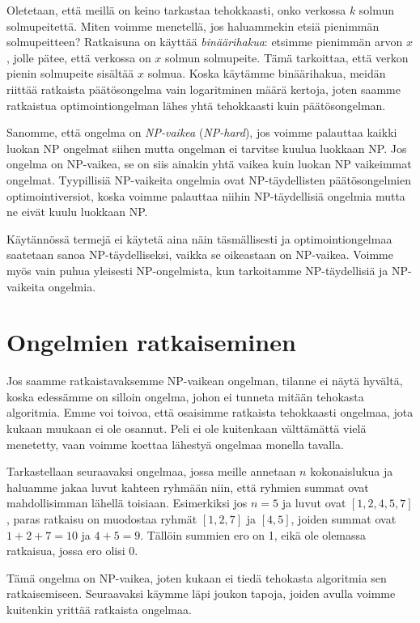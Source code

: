 Oletetaan, että meillä on keino tarkastaa tehokkaasti,
onko verkossa $k$ solmun solmupeitettä.
Miten voimme menetellä, jos haluammekin etsiä pienimmän
solmupeitteen?
Ratkaisuna on käyttää \emph{binäärihakua}:
etsimme pienimmän arvon $x$, jolle pätee,
että verkossa on $x$ solmun solmupeite.
Tämä tarkoittaa, että verkon pienin solmupeite
sisältää $x$ solmua.
Koska käytämme binäärihakua, meidän riittää ratkaista
päätösongelma vain logaritminen mää\-rä kertoja,
joten saamme ratkaistua optimointiongelman lähes yhtä
tehokkaasti kuin päätösongelman.


Sanomme, että ongelma on \emph{NP-vaikea} (\emph{NP-hard}), jos voimme palauttaa
kaikki luokan NP ongelmat siihen mutta ongelman ei
tarvitse kuulua luokkaan NP.
Jos ongelma on NP-vaikea, se on siis ainakin yhtä vaikea
kuin luokan NP vaikeimmat ongelmat.
Tyypillisiä NP-vaikeita ongelmia ovat NP-täydellisten
päätösongelmien optimointiversiot,
koska voimme palauttaa niihin NP-täy\-dellisiä ongelmia
mutta ne eivät kuulu luokkaan NP.

Käytännössä termejä ei käytetä aina näin täsmällisesti
ja optimointiongelmaa saatetaan sanoa NP-täydelliseksi,
vaikka se oikeastaan on NP-vaikea.
Voimme myös vain puhua yleisesti NP-ongelmista,
kun tarkoitamme NP-täydellisiä ja NP-vaikeita ongelmia.

\section{Ongelmien ratkaiseminen}

Jos saamme ratkaistavaksemme NP-vaikean ongelman,
tilanne ei näytä hy\-vältä, koska edessämme on silloin ongelma,
johon ei tunneta mitään tehokasta algoritmia.
Emme voi toivoa, että osaisimme ratkaista tehokkaasti ongelmaa,
jota kukaan muukaan ei ole osannut.
Peli ei ole kuitenkaan välttämättä vielä menetetty,
vaan voimme koettaa lähestyä ongelmaa monella tavalla.

Tarkastellaan seuraavaksi ongelmaa, jossa meille annetaan $n$
kokonaislukua ja haluamme jakaa luvut kahteen ryhmään niin,
että ryhmien summat ovat mahdollisimman lähellä toisiaan.
Esimerkiksi jos $n=5$ ja luvut ovat $[1,2,4,5,7]$,
paras ratkaisu on muodostaa ryhmät $[1,2,7]$ ja $[4,5]$,
joiden summat ovat $1+2+7=10$ ja $4+5=9$.
Tällöin summien ero on 1,
eikä ole olemassa ratkaisua, jossa ero olisi 0.

Tämä ongelma on NP-vaikea, joten kukaan ei tiedä tehokasta
algoritmia sen ratkaisemiseen.
Seuraavaksi käymme läpi joukon tapoja, joiden avulla
voimme kuitenkin yrittää ratkaista ongelmaa.

